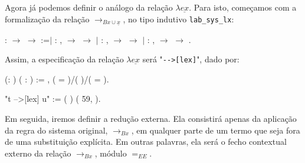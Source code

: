 \bigskip

Agora já podemos definir o análogo da relação $\lambda \underline{ex}$.
Para isto, começamos com a formalização da relação $\rightarrow_{Bx \cup
    \underline{x}}$, no tipo indutivo \texttt{lab\_sys\_lx}:

\bigskip

\coqdocnoindent {} : 
\ensuremath{\rightarrow}  \ensuremath{\rightarrow}
 :=\coqdoceol \coqdocnoindent \ensuremath{|}  :
\coqdockw{\ensuremath{\forall}}  , 
\ensuremath{\rightarrow}  \ensuremath{\rightarrow}
  \coqdoceol \coqdocnoindent
\ensuremath{|}  : \coqdockw{\ensuremath{\forall}}
 , 
\ensuremath{\rightarrow}  \ensuremath{\rightarrow}
  \coqdoceol \coqdocnoindent
\ensuremath{|}  : \coqdockw{\ensuremath{\forall}}
 , 
\ensuremath{\rightarrow} 
\ensuremath{\rightarrow}  
.\coqdoceol \coqdocemptyline

\bigskip

Assim, a especificação da relação $\lambda \underline{ex}$ será
"\texttt{-{}->[lex]}", dado por:

\bigskip

\coqdocnoindent {}  (:
) ( : ) := \coqdoceol
\coqdocindent{2.00em} \coqdoctac{\ensuremath{\exists}} 
, ( =
)/(
 
)/( =
).\coqdoceol \coqdocemptyline

\coqdocnoindent
{} "t -->[lex] u" := (  ) (  59,  ).\coqdoceol

\bigskip

Em seguida, iremos definir a redução externa. Ela consistirá apenas da aplicação
da regra do sistema original, $\rightarrow_{Bx}$, em qualquer parte de um termo
que seja fora de uma substituição explícita. Em outras palavras, ela será o
fecho contextual externo da relação $\rightarrow_{Bx}$, módulo $=_{EE}$.

